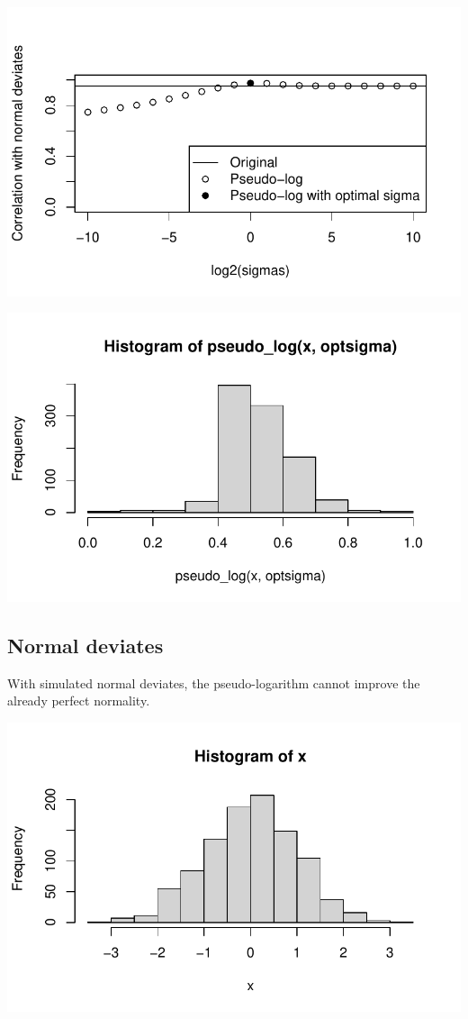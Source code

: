 \documentclass[
  letterpaper,
  DIV=11,
  numbers=noendperiod]{scrreport}
\begin{document}
\includegraphics{./Pseudo_log_explainer_files/figure-pdf/pl08-2.pdf}

\includegraphics{./Pseudo_log_explainer_files/figure-pdf/pl08-3.pdf}

\hypertarget{normal-deviates}{%
\subsection{Normal deviates}\label{normal-deviates}}

With simulated normal deviates, the pseudo-logarithm cannot improve the
already perfect normality.

\includegraphics{./Pseudo_log_explainer_files/figure-pdf/pl09-1.pdf}
\end{document}
